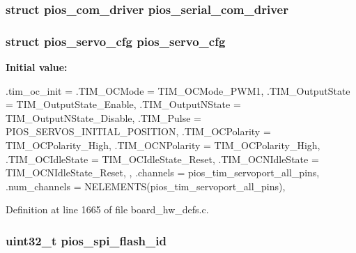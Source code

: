 \hypertarget{group___revolution_gac2e4f2b1a482c1480ae2639bfb241e0f}{
\subsubsection[{pios\-\_\-serial\-\_\-com\-\_\-driver}]{\setlength{\rightskip}{0pt plus 5cm}struct {\bf pios\-\_\-com\-\_\-driver} {\bf pios\-\_\-serial\-\_\-com\-\_\-driver}}}\label{group___revolution_gac2e4f2b1a482c1480ae2639bfb241e0f}
\hypertarget{group___revolution_ga57a87ef16d7949a9cc3589efc8d88a28}{
\subsubsection[{pios\-\_\-servo\-\_\-cfg}]{\setlength{\rightskip}{0pt plus 5cm}struct {\bf pios\-\_\-servo\-\_\-cfg} {\bf pios\-\_\-servo\-\_\-cfg}}}\label{group___revolution_ga57a87ef16d7949a9cc3589efc8d88a28}
{\bfseries \-Initial value\-:}
\begin{DoxyCode}
 {
        .tim_oc_init = {
                .TIM_OCMode = TIM_OCMode_PWM1,
                .TIM_OutputState = TIM_OutputState_Enable,
                .TIM_OutputNState = TIM_OutputNState_Disable,
                .TIM_Pulse = PIOS_SERVOS_INITIAL_POSITION,
                .TIM_OCPolarity = TIM_OCPolarity_High,
                .TIM_OCNPolarity = TIM_OCPolarity_High,
                .TIM_OCIdleState = TIM_OCIdleState_Reset,
                .TIM_OCNIdleState = TIM_OCNIdleState_Reset,
        },
        .channels = pios_tim_servoport_all_pins,
        .num_channels = NELEMENTS(pios_tim_servoport_all_pins),
}
\end{DoxyCode}


\-Definition at line 1665 of file board\-\_\-hw\-\_\-defs.\-c.

\hypertarget{group___revolution_gaebc54f2c5fc298fad979df4d9bd1414b}{
\subsubsection[{pios\-\_\-spi\-\_\-flash\-\_\-id}]{\setlength{\rightskip}{0pt plus 5cm}uint32\-\_\-t {\bf pios\-\_\-spi\-\_\-flash\-\_\-id}}}\label{group___revolution_gaebc54f2c5fc298fad979df4d9bd1414b}


